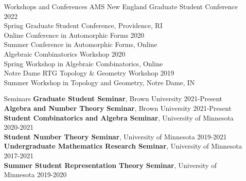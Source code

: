 \documentclass{resume} %
\begin{document}
\begin{rSection}{Workshops and Conferences}
{AMS New England Graduate Student Conference} \hfill {2022} \\
\hphantom{\quad}Spring Graduate Student Conference, Providence, RI \\
{Online Conference in Automorphic Forms} \hfill {2020} \\
\hphantom{\quad}Summer Conference in Automorphic Forms, Online \\
{Algebraic Combinatorics Workshop} \hfill {2020} \\
\hphantom{\quad}Spring Workshop in Algebraic Combinatorics, Online \\
{Notre Dame RTG Topology \& Geometry Workshop} \hfill {2019} \\
\hphantom{\quad}Summer Workshop in Topology and Geometry, Notre Dame, IN
\end{rSection}

\begin{rSection}{Seminars}
{\bf Graduate Student Seminar}, Brown University \hfill {2021-Present} \\
{\bf Algebra and Number Theory Seminar}, Brown University \hfill {2021-Present} \\
{\bf Student Combinatorics and Algebra Seminar}, University of Minnesota \hfill {2020-2021} \\
{\bf Student Number Theory Seminar}, University of Minnesota \hfill {2019-2021} \\
{\bf Undergraduate Mathematics Research Seminar}, University of Minnesota \hfill {2017-2021} \\
{\bf Summer Student Representation Theory Seminar}, University of Minnesota \hfill {2019-2020} \\
\end{rSection}
\end{document}
